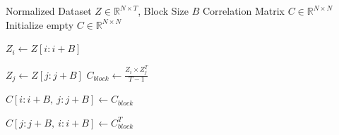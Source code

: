 \begin{minipage}{0.95\textwidth}
    \begin{algorithm}[H]
        \caption{Cache-Optimized Block-wise Correlation}
        \label{alg:block_cpu}
        \begin{algorithmic}[1]
        \Require Normalized Dataset $Z \in \mathbb{R}^{N \times T}$, Block Size $B$
        \Ensure Correlation Matrix $C \in \mathbb{R}^{N \times N}$
            \State Initialize empty $C \in \mathbb{R}^{N \times N}$
            
                \State $Z_i \gets Z[i : i+B]$ 
                
                 
                    \State $Z_j \gets Z[j : j+B]$
                    \State $C_{block} \gets \frac{Z_i \times Z_j^T}{T-1}$ 
                    
                    \State $C[i:i+B, \ j:j+B] \gets C_{block}$
                    
                     
                        \State $C[j:j+B, \ i:i+B] \gets C_{block}^T$
                    \EndIf
                \EndFor
            \EndFor
        \end{algorithmic}
    \end{algorithm}
\end{minipage}

\vspace{0.5cm}

